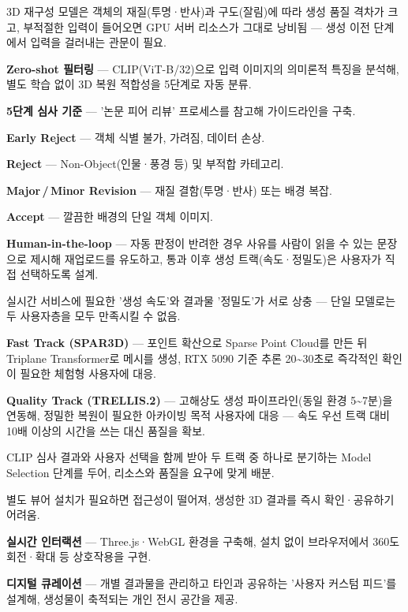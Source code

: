 \begin{substeps}
  \item 3D 재구성 모델은 객체의 재질(투명·반사)과 구도(잘림)에 따라 생성 품질 격차가 크고, 부적절한 입력이 들어오면 GPU 서버 리소스가 그대로 낭비됨 --- 생성 이전 단계에서 입력을 걸러내는 관문이 필요.
  \item \textbf{Zero-shot 필터링} --- CLIP(ViT-B/32)으로 입력 이미지의 의미론적 특징을 분석해, 별도 학습 없이 3D 복원 적합성을 5단계로 자동 분류.
  \item \textbf{5단계 심사 기준} --- '논문 피어 리뷰' 프로세스를 참고해 가이드라인을 구축.
  \begin{substeps2}
    \item \textbf{Early Reject} --- 객체 식별 불가, 가려짐, 데이터 손상.
    \item \textbf{Reject} --- Non-Object(인물·풍경 등) 및 부적합 카테고리.
    \item \textbf{Major\,/\,Minor Revision} --- 재질 결함(투명·반사) 또는 배경 복잡.
    \item \textbf{Accept} --- 깔끔한 배경의 단일 객체 이미지.
  \end{substeps2}
  \item \textbf{Human-in-the-loop} --- 자동 판정이 반려한 경우 사유를 사람이 읽을 수 있는 문장으로 제시해 재업로드를 유도하고, 통과 이후 생성 트랙(속도·정밀도)은 사용자가 직접 선택하도록 설계.
\end{substeps}

\begin{substeps}
  \item 실시간 서비스에 필요한 '생성 속도'와 결과물 '정밀도'가 서로 상충 --- 단일 모델로는 두 사용자층을 모두 만족시킬 수 없음.
  \item \textbf{Fast Track (SPAR3D)} --- 포인트 확산으로 Sparse Point Cloud를 만든 뒤 Triplane Transformer로 메시를 생성, RTX 5090 기준 추론 20\textasciitilde30초로 즉각적인 확인이 필요한 체험형 사용자에 대응.
  \item \textbf{Quality Track (TRELLIS.2)} --- 고해상도 생성 파이프라인(동일 환경 5\textasciitilde7분)을 연동해, 정밀한 복원이 필요한 아카이빙 목적 사용자에 대응 --- 속도 우선 트랙 대비 10배 이상의 시간을 쓰는 대신 품질을 확보.
  \item CLIP 심사 결과와 사용자 선택을 함께 받아 두 트랙 중 하나로 분기하는 Model Selection 단계를 두어, 리소스와 품질을 요구에 맞게 배분.
\end{substeps}

\begin{substeps}
  \item 별도 뷰어 설치가 필요하면 접근성이 떨어져, 생성한 3D 결과를 즉시 확인·공유하기 어려움.
  \item \textbf{실시간 인터랙션} --- Three.js·WebGL 환경을 구축해, 설치 없이 브라우저에서 360도 회전·확대 등 상호작용을 구현.
  \item \textbf{디지털 큐레이션} --- 개별 결과물을 관리하고 타인과 공유하는 '사용자 커스텀 피드'를 설계해, 생성물이 축적되는 개인 전시 공간을 제공.
\end{substeps}
